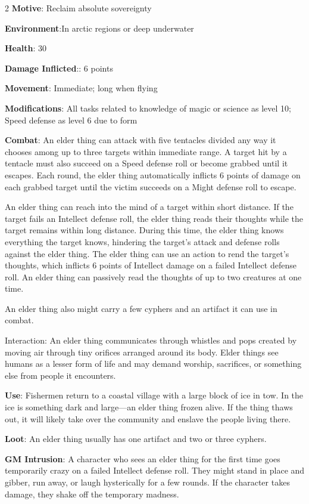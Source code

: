 \begin{multicols}{2}
\textbf{Motive}: Reclaim absolute sovereignty

\textbf{Environment}:In arctic regions or deep underwater

\textbf{Health}: 30

\textbf{Damage Inflicted}:: 6 points

\textbf{Movement}: Immediate; long when flying

\textbf{Modifications}: All tasks related to knowledge of magic or science as level 10; Speed defense as level 6 due to form

\textbf{Combat}: An elder thing can attack with five tentacles divided any way it chooses among up to three targets within immediate range. A target hit by a tentacle must also succeed on a Speed defense roll or become grabbed until it escapes. Each round, the elder thing automatically inflicts 6 points of damage on each grabbed target until the victim succeeds on a Might defense roll to escape. 

An elder thing can reach into the mind of a target within short distance. If the target fails an Intellect defense roll, the elder thing reads their thoughts while the target remains within long distance. During this time, the elder thing knows everything the target knows, hindering the target’s attack and defense rolls against the elder thing. The elder thing can use an action to rend the target’s thoughts, which inflicts 6 points of Intellect damage on a failed Intellect defense roll. An elder thing can passively read the thoughts of up to two creatures at one time.

An elder thing also might carry a few cyphers and an artifact it can use in combat.

Interaction: An elder thing communicates through whistles and pops created by moving air through tiny orifices arranged around its body. Elder things see humans as a lesser form of life and may demand worship, sacrifices, or something else from people it encounters.

\textbf{Use}: Fishermen return to a coastal village with a large block of ice in tow. In the ice is something dark and large—an elder thing frozen alive. If the thing thaws out, it will likely take over the community and enslave the people living there.

\textbf{Loot}: An elder thing usually has one artifact and two or three cyphers.

\textbf{GM Intrusion}: A character who sees an elder thing for the first time goes temporarily crazy on a failed Intellect defense roll. They might stand in place and gibber, run away, or laugh hysterically for a few rounds. If the character takes damage, they shake off the temporary madness. 


\end{multicols}
